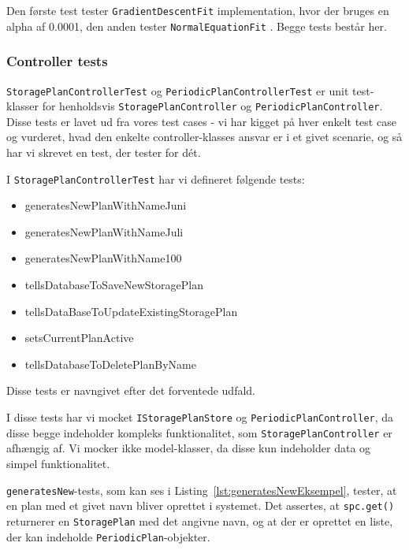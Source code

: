 Den første test tester \texttt{GradientDescentFit}\cite{GradientDescent} implementation, hvor der bruges en alpha af 0.0001, den anden tester \texttt{NormalEquationFit} \cite{NormalEquation}. Begge tests består her. 

\subsubsection{Controller tests}
\texttt{StoragePlanControllerTest} og \texttt{PeriodicPlanControllerTest} er unit test-klasser for henholdsvis \texttt{StoragePlanController} og \texttt{PeriodicPlanController}. Disse tests er lavet ud fra vores test cases - vi har kigget på hver enkelt test case og vurderet, hvad den enkelte controller-klasses ansvar er i et givet scenarie, og så har vi skrevet en test, der tester for dét. 

I \texttt{StoragePlanControllerTest} har vi defineret følgende tests:
\begin{itemize}
    \item generatesNewPlanWithNameJuni
    \item generatesNewPlanWithNameJuli
    \item generatesNewPlanWithName100
    \item tellsDatabaseToSaveNewStoragePlan
    \item tellsDataBaseToUpdateExistingStoragePlan
    \item setsCurrentPlanActive
    \item tellsDatabaseToDeletePlanByName
\end{itemize}
Disse tests er navngivet efter det forventede udfald.

I disse tests har vi mocket \texttt{IStoragePlanStore} og \texttt{PeriodicPlanController}, da disse begge indeholder kompleks funktionalitet, som \texttt{StoragePlanController} er afhængig af. Vi mocker ikke model-klasser, da disse kun indeholder data og simpel funktionalitet.

\texttt{generatesNew}-tests, som kan ses i Listing~\ref{lst:generatesNewEksempel}, tester, at en plan med et givet navn bliver oprettet i systemet. Det assertes, at \texttt{spc.get()} returnerer en \texttt{StoragePlan} med det angivne navn, og at der er oprettet en liste, der kan indeholde \texttt{PeriodicPlan}-objekter. 

